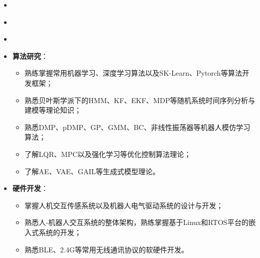 \begin{itemize}[leftmargin=*]
  \item {}
\end{itemize}

\vspace{-1mm}
\begin{itemize}[leftmargin=*]
  \item {}
\end{itemize}

\vspace{-1mm}
\begin{itemize}[leftmargin=*]
  \item {}
\end{itemize}

\vspace{-1mm}
\begin{itemize}[leftmargin=*]
  \item \textbf{算法研究}：
  {\small
  \begin{itemize}
    \item 熟练掌握常用机器学习、深度学习算法以及SK-Learn、Pytorch等算法开发框架；
    \item 熟悉贝叶斯学派下的HMM、KF、EKF、MDP等随机系统时间序列分析与建模等理论知识；
    \item 熟悉DMP、pDMP、GP、GMM、BC、非线性振荡器等机器人模仿学习算法；
    \item 了解LQR、MPC以及强化学习等优化控制算法理论；
    \item 了解AE、VAE、GAIL等生成式模型理论。
  \end{itemize}}
\end{itemize}

\vspace{-3mm}
\begin{itemize}[leftmargin=*]
  \item \textbf{硬件开发}：
  {\small
  \begin{itemize}
    \item 掌握人机交互传感系统以及机器人电气驱动系统的设计与开发；
    \item 熟悉人-机器人交互系统的整体架构，熟练掌握基于Linux和RTOS平台的嵌入式系统的开发；
    \item 熟悉BLE、2.4G等常用无线通讯协议的软硬件开发。
  \end{itemize}}
\end{itemize}

